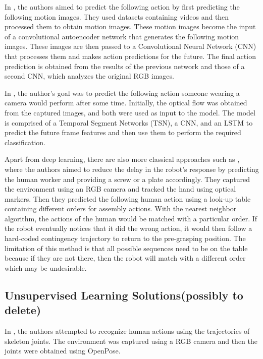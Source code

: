In \cite{Rodriguez2019}, the authors aimed to predict the following action by first predicting the following motion images. They used datasets containing videos and then processed them to obtain motion images. These motion images become the input of a convolutional autoencoder network that generates the following motion images. These images are then passed to a Convolutional Neural Network (CNN) that processes them and makes action predictions for the future. The final action prediction is obtained from the results of the previous network and those of a second CNN, which analyzes the original RGB images.

In \cite{Wu2021}, the author's goal was to predict the following action someone wearing a camera would perform after some time. Initially, the optical flow was obtained from the captured images, and both were used as input to the model. The model is comprised of a Temporal Segment Networks (TSN), a CNN, and an LSTM to predict the future frame features and then use them to perform the required classification.

Apart from deep learning, there are also more classical approaches such as \cite{Maeda2016}, where the authors aimed to reduce the delay in the robot's response by predicting the human worker and providing a screw or a plate accordingly. They captured the environment using an RGB camera and tracked the hand using optical markers. Then they predicted the following human action using a look-up table containing different orders for assembly actions. With the nearest neighbor algorithm, the actions of the human would be matched with a particular order. If the robot eventually notices that it did the wrong action, it would then follow a hard-coded contingency trajectory to return to the pre-grasping position. The limitation of this method is that all possible sequences need to be on the table because if they are not there, then the robot will match with a different order which may be undesirable.

{\color{red}
\subsection{Unsupervised Learning Solutions(possibly to delete)}

In \cite{Kato2018}, the authors attempted to recognize human actions using the trajectories of skeleton joints. The environment was captured using a RGB camera and then the joints were obtained using OpenPose.
}

